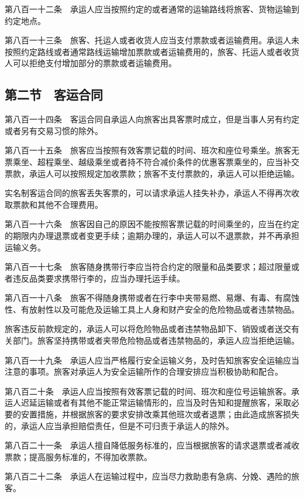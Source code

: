 \documentclass[UTF8,12pt,a4paper]{ctexbook}
\begin{document}
第八百一十二条　承运人应当按照约定的或者通常的运输路线将旅客、货物运输到约定地点。

第八百一十三条　旅客、托运人或者收货人应当支付票款或者运输费用。承运人未按照约定路线或者通常路线运输增加票款或者运输费用的，旅客、托运人或者收货人可以拒绝支付增加部分的票款或者运输费用。

\subsection*{第二节　客运合同}

第八百一十四条　客运合同自承运人向旅客出具客票时成立，但是当事人另有约定或者另有交易习惯的除外。

第八百一十五条　旅客应当按照有效客票记载的时间、班次和座位号乘坐。旅客无票乘坐、超程乘坐、越级乘坐或者持不符合减价条件的优惠客票乘坐的，应当补交票款，承运人可以按照规定加收票款；旅客不支付票款的，承运人可以拒绝运输。

实名制客运合同的旅客丢失客票的，可以请求承运人挂失补办，承运人不得再次收取票款和其他不合理费用。

第八百一十六条　旅客因自己的原因不能按照客票记载的时间乘坐的，应当在约定的期限内办理退票或者变更手续；逾期办理的，承运人可以不退票款，并不再承担运输义务。

第八百一十七条　旅客随身携带行李应当符合约定的限量和品类要求；超过限量或者违反品类要求携带行李的，应当办理托运手续。

第八百一十八条　旅客不得随身携带或者在行李中夹带易燃、易爆、有毒、有腐蚀性、有放射性以及可能危及运输工具上人身和财产安全的危险物品或者违禁物品。

旅客违反前款规定的，承运人可以将危险物品或者违禁物品卸下、销毁或者送交有关部门。旅客坚持携带或者夹带危险物品或者违禁物品的，承运人应当拒绝运输。

第八百一十九条　承运人应当严格履行安全运输义务，及时告知旅客安全运输应当注意的事项。旅客对承运人为安全运输所作的合理安排应当积极协助和配合。

第八百二十条　承运人应当按照有效客票记载的时间、班次和座位号运输旅客。承运人迟延运输或者有其他不能正常运输情形的，应当及时告知和提醒旅客，采取必要的安置措施，并根据旅客的要求安排改乘其他班次或者退票；由此造成旅客损失的，承运人应当承担赔偿责任，但是不可归责于承运人的除外。

第八百二十一条　承运人擅自降低服务标准的，应当根据旅客的请求退票或者减收票款；提高服务标准的，不得加收票款。

第八百二十二条　承运人在运输过程中，应当尽力救助患有急病、分娩、遇险的旅客。
\end{document}
